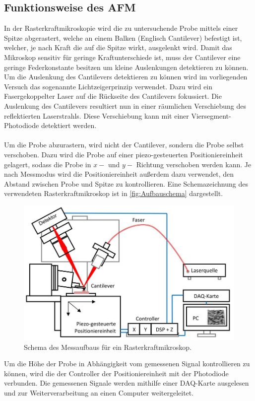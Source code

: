 \subsection{Funktionsweise des AFM}
\label{subsec:afmfunk}
In der Rasterkraftmikroskopie wird die zu untersuchende Probe mittels einer Spitze abgerastert, welche an einem Balken (Englisch Cantilever) befestigt ist, welcher, je nach Kraft die auf die Spitze wirkt, ausgelenkt wird.
Damit das Mikroskop sensitiv für geringe Kraftunterschiede ist, muss der Cantilever eine geringe Federkonstante besitzen um kleine Auslenkungen detektieren zu können. Um die Auslenkung des Cantilevers detektieren zu können wird im vorliegenden Versuch das sogenannte Lichtzeigerprinzip verwendet. Dazu wird ein Fasergekoppelter Laser auf die Rückseite des Cantilevers fokussiert. Die Auslenkung des Cantilevers resultiert nun in einer räumlichen Verschiebung des reflektierten Laserstrahls. Diese Verschiebung kann mit einer Viersegment-Photodiode detektiert werden.\\
\\
Um die Probe abzurastern, wird nicht der Cantilever, sondern die Probe selbst verschoben. Dazu wird die Probe auf einer piezo-gesteuerten Positioniereinheit gelagert, sodass die Probe in $x-$ und $y-$ Richtung verschoben werden kann. Je nach Messmodus wird die Positioniereinheit außerdem dazu verwendet, den Abstand zwischen Probe und Spitze zu kontrollieren. Eine Schemazeichnung des verwendeten Rasterkraftmikroskop ist in \autoref{fig:Aufbauschema} dargestellt.
\begin{figure}[H]
\centering
  \includegraphics[width=\textwidth]{content/Aufbau.jpg}
  \caption{Schema des Messaufbaus für ein Rasterkraftmikroskop.}
  \label{fig:Aufbauschema}
\end{figure}
Um die Höhe der Probe in Abhängigkeit vom gemessenen Signal kontrollieren zu können, wird die der Controller der Positioniereinheit mit der Photodiode verbunden. Die gemessenen Signale werden mithilfe einer DAQ-Karte ausgelesen und zur Weiterverarbeitung an einen Computer weitergeleitet.

